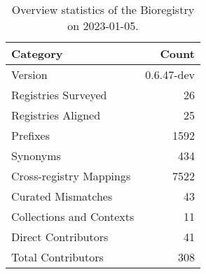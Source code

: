 \begin{table}
\centering
\caption{Overview statistics of the Bioregistry on 2023-01-05.}
\label{tab:bioregistry-summary}
\begin{tabular}{lr}
\toprule
                Category &      Count \\
\midrule
                 Version & 0.6.47-dev \\
     Registries Surveyed &         26 \\
      Registries Aligned &         25 \\
                Prefixes &       1592 \\
                Synonyms &        434 \\
 Cross-registry Mappings &       7522 \\
      Curated Mismatches &         43 \\
Collections and Contexts &         11 \\
     Direct Contributors &         41 \\
      Total Contributors &        308 \\
\bottomrule
\end{tabular}
\end{table}
